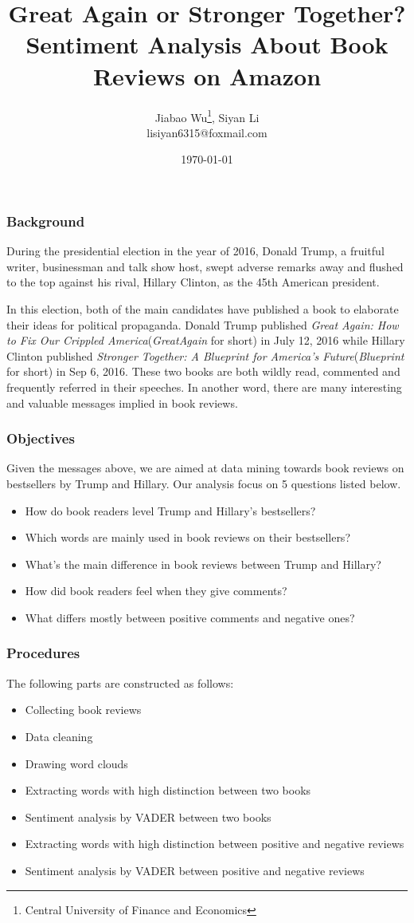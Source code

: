 \documentclass[9pt]{beamer}
\title{Great Again or Stronger Together? Sentiment Analysis About Book Reviews on Amazon}
\author{Jiabao Wu\thanks{Central University of Finance and Economics}, Siyan Li\footnotemark[1] \\ \footnotesize lisiyan6315@foxmail.com}
\date{\today}
\begin{document}
\begin{frame}
\titlepage
\end{frame}

\begin{frame}
\frametitle{Background}
During the presidential election in the year of 2016, Donald Trump, a fruitful writer, businessman and talk show host, swept adverse remarks away and flushed to the top against his rival, Hillary Clinton, as the 45th American president.

In this election, both of the main candidates have published a book to elaborate their ideas for political propaganda. Donald Trump published \textit{Great Again: How to Fix Our Crippled America}(\textit{GreatAgain} for short) in July 12, 2016 while Hillary Clinton published \textit{Stronger Together: A Blueprint for America's Future}(\textit{Blueprint} for short) in Sep 6, 2016. These two books are both wildly read, commented and frequently referred in their speeches. In another word, there are many interesting and valuable messages implied in book reviews.
\end{frame}

\begin{frame}
\frametitle{Objectives}
Given the messages above, we are aimed at data mining towards book reviews on bestsellers by Trump and Hillary. Our analysis focus on 5 questions listed below.
\begin{itemize}
	\item How do book readers level Trump and Hillary's bestsellers?
	\item Which words are mainly used in book reviews on their bestsellers?
	\item What's the main difference in book reviews between Trump and Hillary?
	\item How did book readers feel when they give comments?
	\item What differs mostly between positive comments and negative ones?
 \end{itemize}
\end{frame}

\begin{frame}
\frametitle{Procedures}
The following parts are constructed as follows:
\begin{itemize}
	\item Collecting book reviews
	\item Data cleaning
	\item Drawing word clouds
	\item Extracting words with high distinction between two books
	\item Sentiment analysis by VADER between two books
	\item Extracting words with high distinction between positive and negative reviews
	\item Sentiment analysis by VADER between positive and negative reviews
\end{itemize}
\end{frame}
\end{document}
